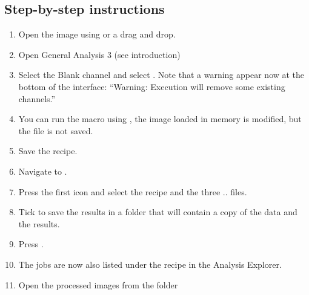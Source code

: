 \subsection*{Step-by-step instructions}
\begin{enumerate} 
    \item Open the image  using  or a drag and drop.
    \item Open General Analysis 3 (see introduction)
    \item Select the Blank channel and select . Note that a warning appear now at the bottom of the interface: ``Warning: Execution will remove some existing channels.''
    \item You can run the macro using , the image loaded in memory is modified, but the file is not saved.
    \item Save the recipe.
    \item Navigate to .
    \item Press the first icon  and select the recipe and the three  ..   files.
    \item Tick  to save the results in a folder 
     that will contain a copy of the data and the results.
    \item Press .
    \item The jobs are now also listed under the recipe in the Analysis Explorer.
    \item Open the processed images from the folder 
\end{enumerate}